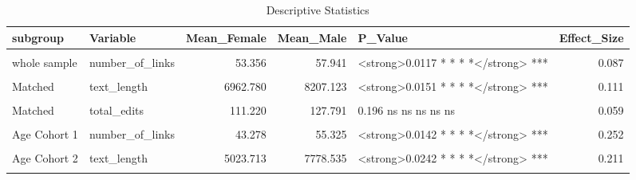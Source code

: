 \begin{table}
\centering
\caption{Descriptive Statistics}
\centering
\begin{tabular}[t]{llrrlr}
\toprule
subgroup & Variable & Mean_Female & Mean_Male & P_Value & Effect_Size\\
\midrule
\cellcolor{gray!10}{whole sample} & \cellcolor{gray!10}{text_length} & \cellcolor{gray!10}{6962.780} & \cellcolor{gray!10}{7141.667} & \cellcolor{gray!10}{0.63 ns ns ns ns ns} & \cellcolor{gray!10}{0.017}\\
\cmidrule{1-6}
whole sample & number_of_links & 53.356 & 57.941 & <strong>0.0117 * * * *</strong> *** & 0.087\\
\cmidrule{1-6}
\cellcolor{gray!10}{whole sample} & \cellcolor{gray!10}{total_edits} & \cellcolor{gray!10}{111.220} & \cellcolor{gray!10}{107.160} & \cellcolor{gray!10}{0.679 ns ns ns ns ns} & \cellcolor{gray!10}{-0.016}\\
\cmidrule{1-6}
Matched & text_length & 6962.780 & 8207.123 & <strong>0.0151 * * * *</strong> *** & 0.111\\
\cmidrule{1-6}
\cellcolor{gray!10}{Matched} & \cellcolor{gray!10}{number_of_links} & \cellcolor{gray!10}{53.356} & \cellcolor{gray!10}{58.639} & \cellcolor{gray!10}{<strong>0.0248 * * * *</strong> ***} & \cellcolor{gray!10}{0.102}\\
\cmidrule{1-6}
Matched & total_edits & 111.220 & 127.791 & 0.196 ns ns ns ns ns & 0.059\\
\cmidrule{1-6}
\cellcolor{gray!10}{Age Cohort 1} & \cellcolor{gray!10}{text_length} & \cellcolor{gray!10}{4780.994} & \cellcolor{gray!10}{6259.572} & \cellcolor{gray!10}{<strong>0.0334 * * * *</strong> ***} & \cellcolor{gray!10}{0.217}\\
\cmidrule{1-6}
Age Cohort 1 & number_of_links & 43.278 & 55.325 & <strong>0.0142 * * * *</strong> *** & 0.252\\
\cmidrule{1-6}
\cellcolor{gray!10}{Age Cohort 1} & \cellcolor{gray!10}{total_edits} & \cellcolor{gray!10}{54.415} & \cellcolor{gray!10}{82.165} & \cellcolor{gray!10}{<strong>0.0214 * * * *</strong> ***} & \cellcolor{gray!10}{0.233}\\
\cmidrule{1-6}
Age Cohort 2 & text_length & 5023.713 & 7778.535 & <strong>0.0242 * * * *</strong> *** & 0.211\\
\cmidrule{1-6}
\cellcolor{gray!10}{Age Cohort 2} & \cellcolor{gray!10}{number_of_links} & \cellcolor{gray!10}{44.689} & \cellcolor{gray!10}{53.682} & \cellcolor{gray!10}{0.0807 . . . . .} & \cellcolor{gray!10}{0.176}\\

\end{tabular}
\end{table}
